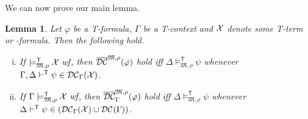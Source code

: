 \documentclass{article}
\newtheorem{lemma}[definition]{Lemma}
\newcommand{\T}{\textsf T}
\newcommand{\wf}{\ \mbox{\em wf}}
\newcommand{\myvdash}[1]{\ensuremath{\vdash^{\mathsf{#1}}}}
\newcommand{\mymodelss}[3]{\ensuremath{\models_{\mathfrak{#2},{#3}}^{\mathsf{#1}}}}
\newcommand{\synDC}[1][{}]{\ifthenelse{\equal{#1}{}}{%
{\ensuremath{{\cal{DC}}}}}{%
{\ensuremath{{\cal{DC}}_{#1}}}}}
\newcommand{\semDC}[2][{\mathfrak M},\rho]{\ensuremath{\overline{\cal{DC}}^{#1}_{#2}}}
\begin{document}
\bigskip\noindent
We can now prove our main lemma.
\begin{lemma}\label{synDCsemDClemma}
Let $\varphi$ be a {\T}-formula, $\Gamma$ be a {\T}-context
and $\cal X$ denote some {\T}-term or -formula.  Then the following hold.
\begin{enumerate}[(i)]
\item If $\mymodelss{T}M\rho{\cal X}\wf$, then
$\semDC{}(\varphi)$ hold iff $\Delta\mymodelss{T}M\rho\psi$
whenever $\Gamma,\Delta\myvdash{T}\psi\in\synDC[\Gamma]({\cal X})$.
\item If $\Gamma\mymodelss{T}M\rho{\cal X}\wf$, then
$\semDC{\Gamma}(\varphi)$ hold iff $\Delta\mymodelss{T}M\rho\psi$ whenever
$\Delta\myvdash{T}\psi\in(\synDC[\Gamma]({\cal X})\cup\synDC(\Gamma))$.
\end{enumerate}
\end{lemma}
\end{document}

